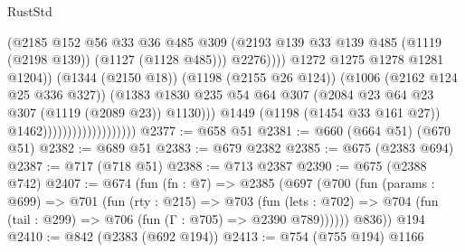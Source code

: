 \begin{lexlean}{RustStd}
\begin{coremodule}
                                                      (@2185
                                                        @152
                                                        @56
                                                        @33
                                                        @36
                                                        @485
                                                        @309
                                                        (@2193
                                                          @139
                                                          @33
                                                          @139
                                                          @485
                                                          (@1119 (@2198 @139))
                                                          (@1127 (@1128 @485)))
                                                        @2276))))
                                                @1272
                                                @1275
                                                @1278
                                                @1281
                                                @1204))
                                            (@1344 (@2150 @18))
                                            (@1198 (@2155 @26 @124))
                                            (@1006 (@2162 @124 @25 @336 @327))
                                            (@1383
                                              @1830
                                              @235
                                              @54
                                              @64
                                              @307
                                              (@2084 @23 @64 @23 @307 (@1119 (@2089 @23)) @1130)))
                                          @1449
                                          (@1198 (@1454 @33 @161 @27))
                                          @1462)))))))))))))))))))
@2377 := @658 @51
@2381 := @660 (@664 @51) (@670 @51)
@2382 := @689 @51
@2383 := @679 @2382
@2385 := @675 (@2383 @694)
@2387 := @717 (@718 @51)
@2388 := @713 @2387
@2390 := @675 (@2388 @742)
@2407 := @674
    (fun (fn : @7) =>
    @2385
      (@697
        (@700
          (fun (params : @699) =>
          @701
            (fun (rty : @215) =>
            @703
              (fun (lets : @702) =>
              @704 (fun (tail : @299) => @706 (fun (Γ : @705) => @2390 @789))))))
        @836))
    @194
@2410 := @842 (@2383 (@692 @194))
@2413 := @754 (@755 @194) @1166

\end{coremodule}
\end{lexlean}
